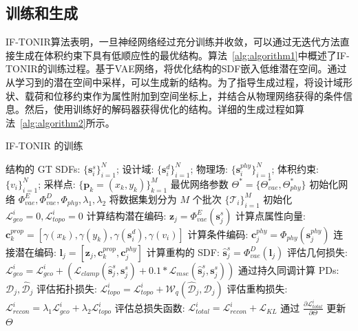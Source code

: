 \subsection{训练和生成}
IF-TONIR算法表明，一旦神经网络经过充分训练并收敛，可以通过无迭代方法直接生成在体积约束下具有低顺应性的最优结构。算法~\ref{alg:algorithm1}中概述了IF-TONIR的训练过程。基于VAE网络，将优化结构的SDF嵌入低维潜在空间。通过从学习到的潜在空间中采样，可以生成新的结构。为了指导生成过程，将设计域形状、载荷和位移约束作为属性附加到空间坐标上，并结合从物理网络获得的条件信息。然后，使用训练好的解码器获得优化的结构。详细的生成过程如算法~\ref{alg:algorithm2}所示。
\begin{algorithm}[htbp]
    \caption{IF-TONIR 的训练}
    \label{alg:algorithm1}
    \begin{algorithmic}[1]
        \REQUIRE 结构的 GT SDFs: $\{\mathbf{s}^s_i\}_{i=1}^{N}$; 设计域: $\{\mathbf{s}^d_i\}_{i=1}^{N}$; 物理场: $\{\mathbf{s}^{phy}_i\}_{i=1}^{N}$; 体积约束: $\{v_i\}_{i=1}^N$; 采样点: $\{\mathbf{p}_k=(x_k, y_k)\}_{k=1}^M$
        \ENSURE 最优网络参数 $\Theta^*=\{\Theta^*_{vae}, \Theta^*_{phy}\}$
        \STATE 初始化网络 $\Phi^{E}_{vae}, \Phi^{D}_{vae}, \Phi_{phy}, \lambda_1, \lambda_2$
            \STATE 将数据集划分为 $M$ 个批次 $\{\mathcal{T}_i\}_{i=1}^M$
                \STATE 初始化 $\mathcal{L}^i_{geo}=0, \mathcal{L}^i_{topo}=0$
                    \STATE 计算结构潜在编码: $\mathbf{z}_j=\Phi^E_{vae}(\mathbf{s}^s_j)$
                    \STATE 计算点属性向量: $\mathbf{c}^{prop}_{k}=[\gamma(x_k),\gamma(y_k),\gamma(\mathbf{s}^{d}_i),\gamma(v_i)]$
                    \STATE 计算条件编码: $\mathbf{c}^{phy}_j=\Phi_{phy}(\mathbf{s}^{phy}_j)$
                    \STATE 连接潜在编码: $\mathbf{l}_j=[\mathbf{z}_j, \mathbf{c}^{prop}_{k}, \mathbf{c}^{phy}_j]$
                    \STATE 计算重构的 SDF: $\hat{\mathbf{s}}^s_j=\Phi^D_{vae}(\mathbf{l}_j)$
                    \STATE 评估几何损失: $\mathcal{L}^i_{geo}=\mathcal{L}^i_{geo}+(\mathcal{L}_{clamp}(\hat{\mathbf{s}}_j^s, \mathbf{s}_j^s)+0.1*\mathcal{L}_{mse}(\hat{\mathbf{s}}_j^s, \mathbf{s}_j^s))$
                    \STATE 通过持久同调计算 PDs: $\mathcal{D}_j, \hat{\mathcal{D}}_j$
                    \STATE 评估拓扑损失: $\mathcal{L}^i_{topo}=\mathcal{L}^i_{topo}+\mathcal{W}_q(\hat{\mathcal{D}}_j, \mathcal{D}_j)$
                    \STATE 评估重构损失: $\mathcal{L}^i_{recon}=\lambda_1\mathcal{L}^i_{geo}+\lambda_2\mathcal{L}^i_{topo}$
                \ENDFOR
                \STATE 评估总损失函数: $\mathcal{L}^i_{total}= \mathcal{L}^i_{recon}+\mathcal{L}_{KL}$
                \STATE 通过 $\frac{\partial \mathcal{L}^i_{total}}{\partial \Theta}$ 更新 $\Theta$
            \ENDFOR
        \ENDWHILE
    \end{algorithmic}
\end{algorithm}


